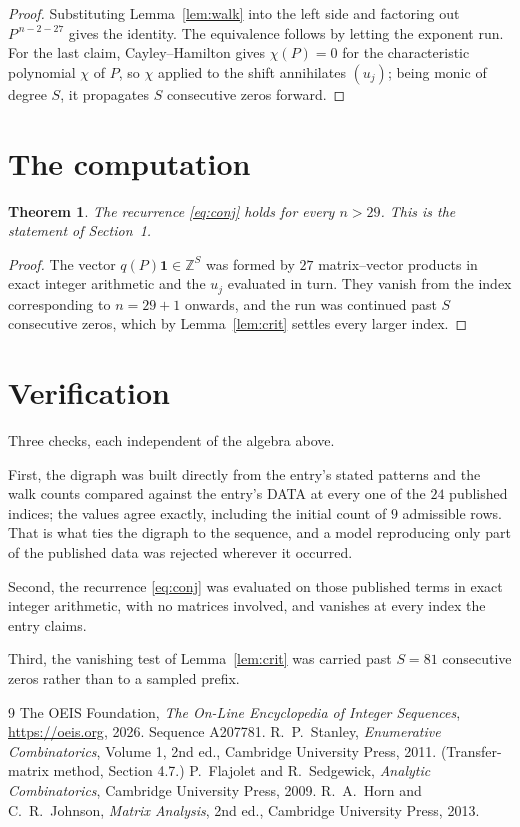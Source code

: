 \documentclass[11pt,a4paper]{article}
\theoremstyle{plain}
\newtheorem{theorem}{Theorem}
\theoremstyle{definition}
\begin{document}
\begin{proof}
Substituting Lemma~\ref{lem:walk} into the left side and factoring out
$P^{\,n-2-27}$ gives the identity. The equivalence follows by letting the exponent
run. For the last claim, Cayley--Hamilton gives $\chi(P)=0$ for the characteristic
polynomial $\chi$ of $P$, so $\chi$ applied to the shift annihilates $(u_j)$; being monic of
degree $S$, it propagates $S$ consecutive zeros forward.
\end{proof}

\section{The computation}

\begin{theorem}
The recurrence \eqref{eq:conj} holds for every $n>29$. This is the statement of
Section~1.
\end{theorem}

\begin{proof}
The vector $q(P)\mathbf{1}\in\mathbb{Z}^{S}$ was formed by $27$ matrix--vector
products in exact integer arithmetic and the $u_j$ evaluated in turn. They vanish from the
index corresponding to $n=29+1$ onwards, and the run was continued past $S$ consecutive
zeros, which by Lemma~\ref{lem:crit} settles every larger index.
\end{proof}

\section{Verification}

Three checks, each independent of the algebra above.

First, the digraph was built directly from the entry's stated patterns and the walk counts
compared against the entry's DATA at every one of the $24$ published indices; the
values agree exactly, including the initial count of $9$ admissible rows. That is
what ties the digraph to the sequence, and a model reproducing only part of the published
data was rejected wherever it occurred.

Second, the recurrence \eqref{eq:conj} was evaluated on those published terms in exact
integer arithmetic, with no matrices involved, and vanishes at every index the entry claims.

Third, the vanishing test of Lemma~\ref{lem:crit} was carried past $S=81$ consecutive
zeros rather than to a sampled prefix.

\begin{thebibliography}{9}
 The OEIS Foundation, \emph{The On-Line Encyclopedia of Integer
Sequences}, \url{https://oeis.org}, 2026. Sequence A207781.
 R.~P.~Stanley, \emph{Enumerative Combinatorics}, Volume 1, 2nd ed.,
Cambridge University Press, 2011. (Transfer-matrix method, Section 4.7.)
 P.~Flajolet and R.~Sedgewick, \emph{Analytic Combinatorics}, Cambridge
University Press, 2009.
 R.~A.~Horn and C.~R.~Johnson, \emph{Matrix Analysis}, 2nd ed., Cambridge
University Press, 2013.
\end{thebibliography}
\end{document}
